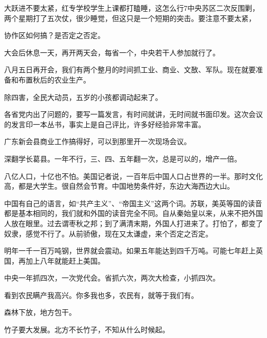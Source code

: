 大跃进不要太紧，红专学校学生上课都打瞌睡，这怎么行7中央苏区二次反围剿，两个星期打了五次仗，很少睡觉，但这只是一个短期的突击。要注意不要太紧，

协作区如何搞？是否定之否定。

大会后休息一天，再开两天会，每省一个，中央若干人参加就行了。

八月五日再开会，我们有两个整月的时间抓工业、商业、文敔、军队。现在就要准备和布置秋后的农业生产。

除四害，全民大动员，五岁的小孩都调动起来了。

各省党内出了问题的，要写一篇发言，有时间就讲，无时间就书面印发。这次会议的发言印一本丛书，事实上是自己评比，许多好经验非常丰富。

广东新会县商业工作搞得好，可以到那里开一次现场会议。

深翻学长葛县。一年不行，三、四、五年翻一次，总是可以的，增产一倍。

八亿人口，十亿也不怕。美国记者说，一百年后中国人口占世界的一半。那时文化高，都是大学生。很自然会节育。中国地势条件好，东边大海西边大山。

中国有自己的语言，如“共产主义”、“帝国主义”这两个词。苏联，美英等国的读音都是基本相同的，我们就和外国的读音完全不同。自从秦始皇以来，从来不把外国人放在眼里。过去谓枣秋之邦；到了满清末期，外国人打进来了。打怕了，都变了奴隶，感觉不行了。从前骄傲，现在又太谦虚，来个否定之否定。

明年一千一百万吨钢，世界就会震动。如果五年能达到四千万吨。可能七年赶上英国，再加上八年就能赶上美国。

中央一年抓四次，一次党代会。省抓六次，两次大检查，小抓四次。

看到农民瞒产我高兴。你多我也多，农民有，就等于我们有。

森林下放，地方包干。

竹子要大发展。北方不长竹子，不知从什么时候起。



